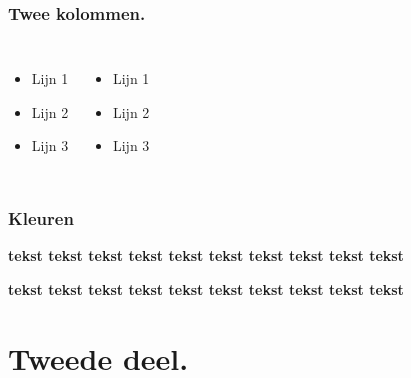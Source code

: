 \documentclass[aspectratio=169]{beamer}
\begin{document}
\begin{frame}
  \frametitle{Twee kolommen.}

  \begin{columns}[c]

    \begin{itemize}
    \item Lijn 1
    \item Lijn 2
    \item Lijn 3
    \end{itemize}

    \begin{itemize}
    \item Lijn 1
    \item Lijn 2
    \item Lijn 3
    \end{itemize}

  \end{columns}
\end{frame}

\begin{frame}
  \frametitle{Kleuren}

  \textbf{\textcolor{hgdarkgreen}{tekst}
  \textcolor{hgpink}{tekst}
  \textcolor{hgochre}{tekst}
  \textcolor{hgorange}{tekst}
  \textcolor{hgpurple}{tekst}
  \textcolor{hgblue}{tekst}
  \textcolor{hglightgreen}{tekst}
  \textcolor{hgbrown}{tekst}
  \textcolor{hggrey}{tekst}
  \textcolor{hgyellow}{tekst}}

  \textbf{\colorbox{hgdarkgreen}{tekst}
  \colorbox{hgpink}{tekst}
  \colorbox{hgochre}{tekst}
  \colorbox{hgorange}{tekst}
  \colorbox{hgpurple}{tekst}
  \colorbox{hgblue}{tekst}
  \colorbox{hglightgreen}{tekst}
  \colorbox{hgbrown}{tekst}
  \colorbox{hggrey}{tekst}
  \colorbox{hgyellow}{tekst}}

\end{frame}

\section{Tweede deel.}
\end{document}
